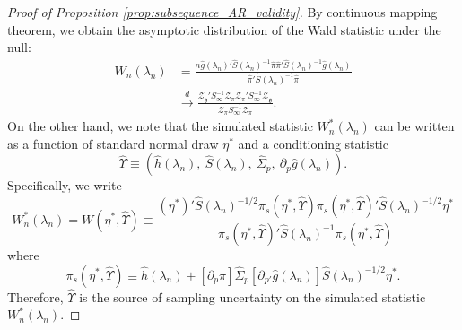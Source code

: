 \documentclass[11pt]{article}
\theoremstyle{definition}
\newcommand{\0}{\ensuremath{\mathbf{0}}}
\begin{document}
\begin{bibunit}
\begin{proof}[Proof of Proposition \ref{prop:subsequence_AR_validity}]
By continuous mapping theorem, we obtain the asymptotic distribution of the Wald statistic under the null:
\begin{align*}
    W_n(\lambda_n) 
    &= \frac{n\hat{g}(\lambda_n)'\hat{S}(\lambda_n)^{-1} \hat{\pi}\hat{\pi}'\hat{S}(\lambda_n)^{-1}\hat{g}(\lambda_n)}{\hat{\pi}'\hat{S}(\lambda_n)^{-1}\hat{\pi}} \\
    &\xrightarrow{d} \frac{\mathcal{Z}_{\mathfrak{g}}' S_\infty^{-1} \mathcal{Z}_\pi \mathcal{Z}_\pi' S_\infty^{-1} \mathcal{Z}_{\mathfrak{g}}}{\mathcal{Z}_\pi S_\infty^{-1} \mathcal{Z}_\pi}.
\end{align*}
On the other hand, we note that the simulated statistic $W_n^*(\lambda_n)$ can be written as a function of standard normal draw $\eta^*$ and a conditioning statistic 
\begin{equation}
\label{eq:Upsilon_hat}
    \hat{\Upsilon} \equiv (\hat{h}(\lambda_n), ~\hat{S}(\lambda_n), ~\hat{\Sigma}_p, ~\partial_p\hat{g}(\lambda_n)).
\end{equation}
Specifically, we write
\begin{equation}
\label{eq:defn_W_eta_C}
    W_n^*(\lambda_n) = W(\eta^*, \hat{\Upsilon}) \equiv \frac{(\eta^*)'\hat{S}(\lambda_n)^{-1/2} \pi_s(\eta^*,\hat{\Upsilon})\pi_s(\eta^*,\hat{\Upsilon})'\hat{S}(\lambda_n)^{-1/2}\eta^*}{\pi_s(\eta^*,\hat{\Upsilon})'\hat{S}(\lambda_n)^{-1}\pi_s(\eta^*,\hat{\Upsilon})} 
\end{equation}
where 
\[
    \pi_s(\eta^*, \hat{\Upsilon}) \equiv \hat{h}(\lambda_n) + [\partial_p \pi] \hat{\Sigma}_p [\partial_{p'}\hat{g}(\lambda_n)] \hat{S}(\lambda_n)^{-1/2} \eta^*.
\]
Therefore, $\hat{\Upsilon}$ is the source of sampling uncertainty on the simulated statistic $W_n^*(\lambda_n)$.


\end{proof}
\end{bibunit}
\end{document}
